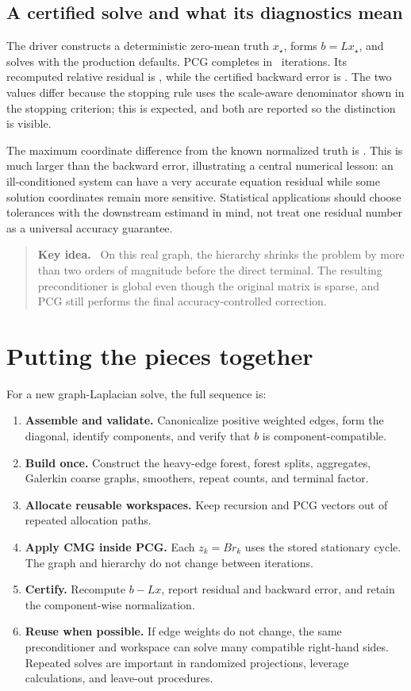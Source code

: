 \documentclass[11pt]{article}
\newenvironment{takeaway}{\begin{quote}\color{cmgnavy}\textbf{Key idea.}\ }{\end{quote}}
\begin{document}
\subsection{A certified solve and what its diagnostics mean}

The driver constructs a deterministic zero-mean truth $x_\star$, forms $b=Lx_\star$, and solves with the production defaults.  PCG completes in \VenetoIterations\ iterations.  Its recomputed relative residual is \VenetoRelativeResidual, while the certified backward error is \VenetoBackwardError.  The two values differ because the stopping rule uses the scale-aware denominator shown in the stopping criterion; this is expected, and both are reported so the distinction is visible.

The maximum coordinate difference from the known normalized truth is \VenetoMaximumError.  This is much larger than the backward error, illustrating a central numerical lesson: an ill-conditioned system can have a very accurate equation residual while some solution coordinates remain more sensitive.  Statistical applications should choose tolerances with the downstream estimand in mind, not treat one residual number as a universal accuracy guarantee.

\begin{takeaway}
On this real graph, the hierarchy shrinks the problem by more than two orders of magnitude before the direct terminal.  The resulting preconditioner is global even though the original matrix is sparse, and PCG still performs the final accuracy-controlled correction.
\end{takeaway}

\FloatBarrier
\section{Putting the pieces together}

For a new graph-Laplacian solve, the full sequence is:
\begin{enumerate}
  \item \textbf{Assemble and validate.} Canonicalize positive weighted edges, form the diagonal, identify components, and verify that $b$ is component-compatible.
  \item \textbf{Build once.} Construct the heavy-edge forest, forest splits, aggregates, Galerkin coarse graphs, smoothers, repeat counts, and terminal factor.
  \item \textbf{Allocate reusable workspaces.} Keep recursion and PCG vectors out of repeated allocation paths.
  \item \textbf{Apply CMG inside PCG.} Each $z_k=Br_k$ uses the stored stationary cycle.  The graph and hierarchy do not change between iterations.
  \item \textbf{Certify.} Recompute $b-Lx$, report residual and backward error, and retain the component-wise normalization.
  \item \textbf{Reuse when possible.} If edge weights do not change, the same preconditioner and workspace can solve many compatible right-hand sides.  Repeated solves are important in randomized projections, leverage calculations, and leave-out procedures.
\end{enumerate}
\end{document}
